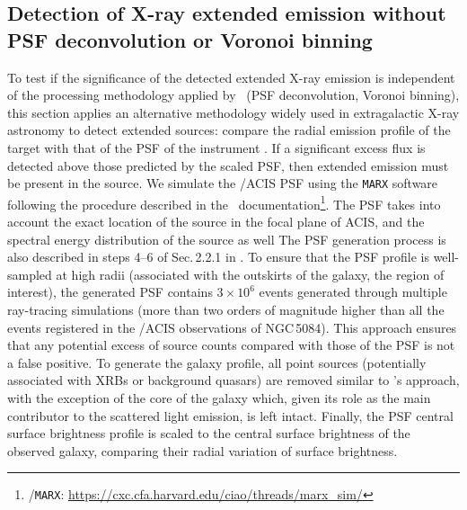 \documentclass[modern]{CORE-AAS/aastex631}
\begin{document}
\subsection{Detection of X-ray extended emission without PSF deconvolution or Voronoi binning}
\label{Appendix:Xray_noPSFdeco_test}
To test if the significance of the detected extended X-ray emission is independent of the processing methodology applied by \SAUNAS\ (PSF deconvolution, Voronoi binning), this section applies an alternative methodology widely used in extragalactic X-ray astronomy to detect extended sources: compare the radial emission profile of the target with that of the PSF of the instrument \citep{fabbiano+2017apj842_4,fabbiano+2018apj855_131, jones+2020apj891_133,ma+2020apj900_164,ma+2023apj948_61}. If a significant excess flux is detected above those predicted by the scaled PSF, then extended emission must be present in the source.
We simulate the \Chandra/ACIS PSF using the \texttt{MARX} software following the procedure described in the \ciao\ documentation\footnote{\ciao/\texttt{MARX}: \url{https://cxc.cfa.harvard.edu/ciao/threads/marx_sim/}}. The PSF takes into account the exact location of the source in the focal plane of ACIS, and the spectral energy distribution of the source as well The PSF generation process is also described in steps 4--6 of Sec.\,2.2.1 in \citet{borlaff+2024apj967_169}. To ensure that the PSF profile is well-sampled at high radii (associated with the outskirts of the galaxy, the region of interest), the generated PSF contains $3\times10^6$ events generated through multiple ray-tracing simulations (more than two orders of magnitude higher than all the events registered in the \Chandra/ACIS observations of NGC\,5084). This approach ensures that any potential excess of source counts compared with those of the PSF is not a false positive.
To generate the galaxy profile, all point sources (potentially associated with XRBs or background quasars) are removed similar to \SAUNAS's approach, with the exception of the core of the galaxy which, given its role as the main contributor to the scattered light emission, is left intact. Finally, the PSF central surface brightness profile is scaled to the central surface brightness of the observed galaxy, comparing their radial variation of surface brightness.
\end{document}
